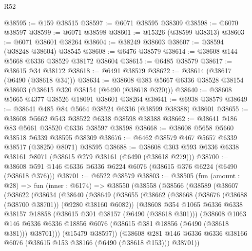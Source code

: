 \begin{lexlean}{R52}
\begin{coremodule}
@38595 := @159 @38515
@38597 := @6071 @38595 @38309
@38598 := @6070 @38597
@38599 := @6071 @38598
@38601 := @15326 (@38599 @38313)
@38603 := @6071 @38601 @38264
@38604 := @38249 @38603
@38607 := @38594 (@38248 @38604) @38545
@38608 := @6476 @38579
@38614 := @38608 @144 @5668 @6336 @38529 @38172 @38604
@38615 := @6485 @38579
@38617 := @38615 @34 @38172
@38618 := @6491 @38579
@38622 := @38614 (@38617 (@6490 (@38618 @34)))
@38634 := @38608 @383 @5667 @6336 @38528 @38154 @38603 (@38615 @320 @38154 (@6490 (@38618 @320)))
@38640 := @38608 @5665 @4377 @38526 @18091 @38601 @38264
@38641 := @6938 @38579
@38649 := @38641 @485 @84 @5664 @38524 @6336 (@38599 @38388) @38601
@38655 := @38608 @5662 @543 @38522 @6338 @38598 @38388
@38662 := @38641 @186 @83 @5661 @38520 @6336 @38597 @38598
@38668 := @38608 @5658 @5660 @38518 @6339 @38595 @38309
@38676 := @6462 @38579 @467 @5657 @6339 @38517 (@38250 @8071) @38595
@38688 := @38608 @303 @593 @6336 @6338 @38161 @8071 (@38615 @279 @38161 (@6490 (@38618 @279)))
@38700 := @38608 @591 @146 @6336 @6336 @6224 @6076 (@38615 @376 @6224 (@6490 (@38618 @376)))
@38701 := @6522 @38579
@38803 := @38505
    (fun (amount : @28) =>
    fun (inner : @6174) =>
    @38550
      (@38558
        (@38566
          (@38589
            (@38607
              (@38622
                (@38634
                  (@38640
                    (@38649
                      (@38655
                        (@38662
                          (@38668
                            (@38676 (@38688 (@38700 @38701)) (@9280 @38160 @6082))
                            (@38608
                              @354
                              @1065
                              @6336
                              @6338
                              @38157
                              @18858
                              (@38615 @301 @38157 (@6490 (@38618 @301)))
                              (@38608
                                @1063
                                @146
                                @6336
                                @6336
                                @18856
                                @6076
                                (@38615 @381 @18856 (@6490 (@38618 @381)))
                                @38701)))
                          (@15479 @38597))
                        (@38608
                          @281
                          @146
                          @6336
                          @6336
                          @38166
                          @6076
                          (@38615 @153 @38166 (@6490 (@38618 @153)))
                          @38701))

\end{coremodule}
\end{lexlean}
